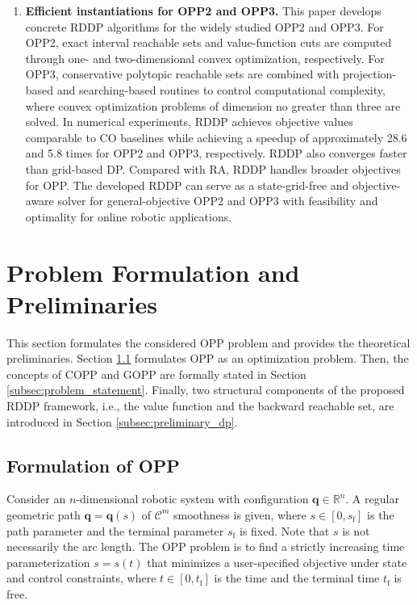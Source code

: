 \documentclass[journal]{IEEEtran}
\theoremstyle{definition}
\theoremstyle{definition}
\newcommand\R{{\mathbb{R}}}
\renewcommand\vector[1]{\boldsymbol{#1}}
\newcommand\vq{{\vector{q}}}
\begin{document}
\begin{enumerate}
    \item \textbf{Efficient instantiations for OPP2 and OPP3.} This paper develops concrete RDDP algorithms for the widely studied OPP2 and OPP3. For OPP2, exact interval reachable sets and value-function cuts are computed through one- and two-dimensional convex optimization, respectively. For OPP3, conservative polytopic reachable sets are combined with projection-based and searching-based routines to control computational complexity, where convex optimization problems of dimension no greater than three are solved. In numerical experiments, RDDP achieves objective values comparable to CO baselines while achieving a speedup of approximately 28.6 and 5.8 times for OPP2 and OPP3, respectively. RDDP also converges faster than grid-based DP. Compared with RA, RDDP handles broader objectives for OPP. The developed RDDP can serve as a state-grid-free and objective-aware solver for general-objective OPP2 and OPP3 with feasibility and optimality for online robotic applications.
\end{enumerate}

\section{Problem Formulation and Preliminaries}\label{sec:formulation_preliminaries}

This section formulates the considered OPP problem and provides the theoretical preliminaries. Section \ref{subsec:formulation_opp} formulates OPP as an optimization problem. Then, the concepts of COPP and GOPP are formally stated in Section \ref{subsec:problem_statement}. Finally, two structural components of the proposed RDDP framework, i.e., the value function and the backward reachable set, are introduced in Section \ref{subsec:preliminary_dp}.

\subsection{Formulation of OPP}\label{subsec:formulation_opp}

Consider an $n$-dimensional robotic system with configuration $\vq\in\R^n$. A regular geometric path $\vq=\vq(s)$ of $\mathcal{C}^m$ smoothness is given, where $s\in[0,s_\text{f}]$ is the path parameter and the terminal parameter $s_\text{f}$ is fixed. Note that $s$ is not necessarily the arc length. The OPP problem is to find a strictly increasing time parameterization $s=s(t)$ that minimizes a user-specified objective under state and control constraints, where $t\in[0,t_\text{f}]$ is the time and the terminal time $t_\text{f}$ is free.
\end{document}
